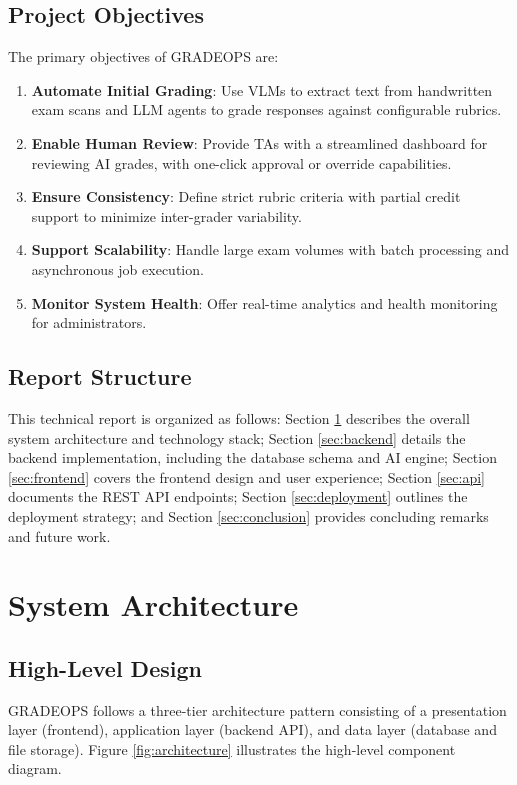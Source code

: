 \documentclass[11pt,a4paper]{article}
\begin{document}
\subsection{Project Objectives}
The primary objectives of GRADEOPS are:

\begin{enumerate}[leftmargin=2em]
    \item \textbf{Automate Initial Grading}: Use VLMs to extract text from handwritten exam scans and LLM agents to grade responses against configurable rubrics.
    \item \textbf{Enable Human Review}: Provide TAs with a streamlined dashboard for reviewing AI grades, with one-click approval or override capabilities.
    \item \textbf{Ensure Consistency}: Define strict rubric criteria with partial credit support to minimize inter-grader variability.
    \item \textbf{Support Scalability}: Handle large exam volumes with batch processing and asynchronous job execution.
    \item \textbf{Monitor System Health}: Offer real-time analytics and health monitoring for administrators.
\end{enumerate}

\subsection{Report Structure}
This technical report is organized as follows: Section \ref{sec:architecture} describes the overall system architecture and technology stack; Section \ref{sec:backend} details the backend implementation, including the database schema and AI engine; Section \ref{sec:frontend} covers the frontend design and user experience; Section \ref{sec:api} documents the REST API endpoints; Section \ref{sec:deployment} outlines the deployment strategy; and Section \ref{sec:conclusion} provides concluding remarks and future work.

\newpage
\section{System Architecture}
\label{sec:architecture}

\subsection{High-Level Design}
GRADEOPS follows a three-tier architecture pattern consisting of a presentation layer (frontend), application layer (backend API), and data layer (database and file storage). Figure \ref{fig:architecture} illustrates the high-level component diagram.
\end{document}
